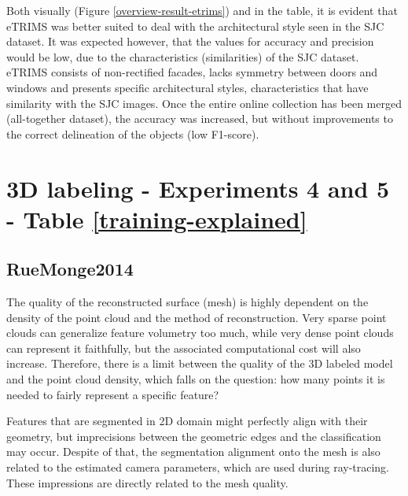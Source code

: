 Both visually (Figure \ref{overview-result-etrims}) and in the table, it is evident that eTRIMS was better suited to deal with the architectural style seen in the SJC dataset. It was expected however, that the values for accuracy and precision would be low, due to the characteristics (similarities) of the SJC dataset. eTRIMS consists of non-rectified facades, lacks symmetry between doors and windows and presents specific architectural styles, characteristics that have similarity with the SJC images. Once the entire online collection has been merged (all-together dataset), the accuracy was increased, but without improvements to the correct delineation of the objects (low F1-score).

\section{3D labeling - Experiments 4 and 5 - Table \ref{training-explained}}  
\subsection{RueMonge2014}
The quality of the reconstructed surface (mesh) is highly dependent on the density of the point cloud and the method of reconstruction. Very sparse point clouds can generalize feature volumetry too much, while very dense point clouds can represent it faithfully, but the associated computational cost will also increase. Therefore, there is a limit between the quality of the 3D labeled model and the point cloud density, which falls on the question: how many points it is needed to fairly represent a specific feature? 

Features that are segmented in 2D domain might perfectly align with their geometry, but imprecisions between the geometric edges and the classification may occur. Despite of that, the segmentation alignment onto the mesh is also related to the estimated camera parameters, which are used during ray-tracing. These impressions are directly related to the mesh quality. 

